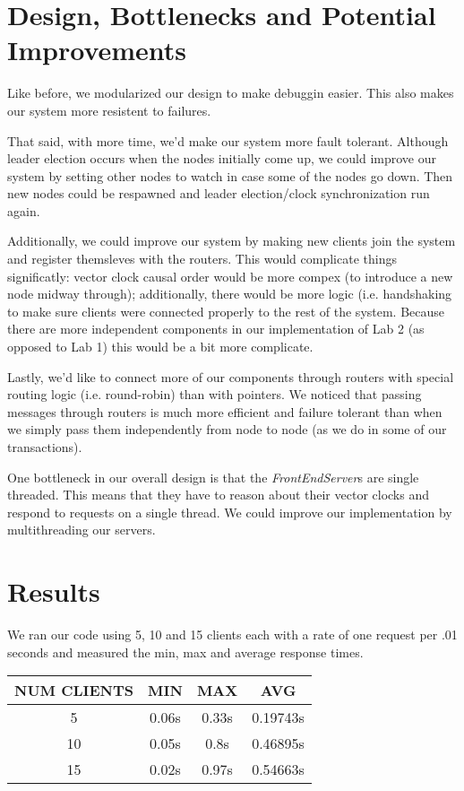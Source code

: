 \documentclass[11pt]{article}
\begin{document}
\section{Design, Bottlenecks and Potential Improvements}
Like before, we modularized our design to make debuggin easier.  This
also makes our system more resistent to failures.

That said, with more time, we'd make our system more fault
tolerant.  Although leader election occurs when the nodes initially
come up, we could improve our system by setting other nodes to watch
in case some of the nodes go down.  Then new nodes could be respawned
and leader election/clock synchronization run again.

Additionally, we could improve our system by making new clients join
the system and register themsleves with the routers.  This would
complicate things significatly: vector clock causal order would be
more compex (to introduce a new node midway through); additionally,
there would be more logic (i.e. handshaking to make sure clients were
connected properly to the rest of the system.  Because there are more
independent components in our implementation of Lab 2 (as opposed to
Lab 1) this would be a bit more complicate.

Lastly, we'd like to connect more of our components through routers
with special routing logic (i.e. round-robin) than with pointers. We
noticed that passing messages through routers is much more efficient
and failure tolerant than when we simply pass them independently from
node to node (as we do in some of our transactions).

One bottleneck in our overall design is that the
\emph{FrontEndServer}s are single threaded.  This means that they have
to reason about their vector clocks and respond to requests on a single
thread.  We could improve our implementation by multithreading our servers.

\section{Results}
We ran our code using 5, 10 and 15 clients each with a rate of one
request per .01 seconds and measured the min, max and average response
times.

\begin{tabular}{c|c|c|c}
  NUM CLIENTS & MIN & MAX & AVG \\
  \hline
  5  & 0.06s & 0.33s & 0.19743s \\
  10 & 0.05s & 0.8s  & 0.46895s \\
  15 & 0.02s & 0.97s & 0.54663s \\
\end{tabular}
\end{document}
